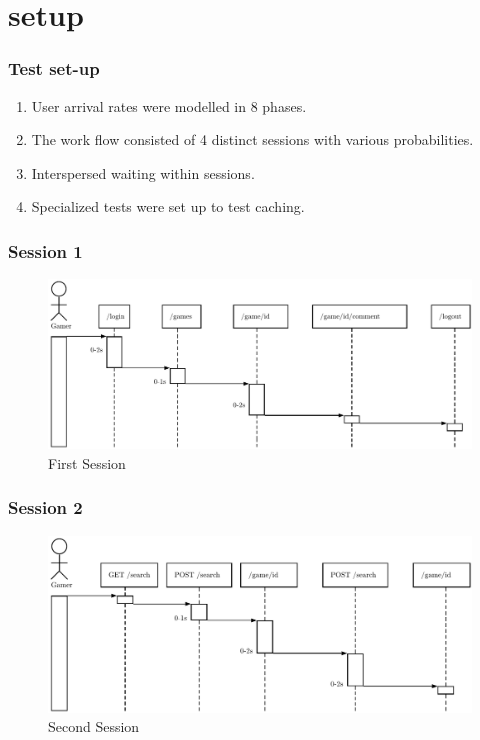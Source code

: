 \section{setup}
\begin{frame}
\frametitle{Test set-up}

\begin{enumerate}
	\setlength\itemsep{1em}
	\item User arrival rates were modelled in 8 phases.
	\item The work flow consisted of 4 distinct sessions with various probabilities.
	\item Interspersed waiting within sessions.
	\item Specialized tests were set up to test caching.  
\end{enumerate}
\end{frame}

\begin{frame}
\frametitle{Session 1}
\begin{figure}[h]
	\centering
	\includegraphics[width=1\textwidth, height=0.5\textheight]{images/generic-1.pdf}
	\caption{First Session}\label{fig:sqlopt}
\end{figure}
\end{frame}

\begin{frame}
\frametitle{Session 2}
\begin{figure}[h]
	\centering
	\includegraphics[width=1\textwidth, height=0.5\textheight]{images/generic-2.pdf}
	\caption{Second Session}\label{fig:sqlopt}
\end{figure}
\end{frame}


